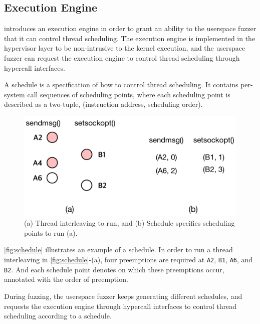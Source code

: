

\subsection{Execution Engine}
\label{ss:engine}

\sys introduces an execution engine in order to grant an ability to
the userspace fuzzer that it can control thread scheduling.
%
The execution engine is implemented in the hypervisor layer to be
non-intrusive to the kernel execution, and the userspace fuzzer can
request the execution engine to control thread scheduling through
hypercall interfaces.


%
A schedule is a specification of how to control thread scheduling.
%
It contains per-system call sequences of scheduling points, where each
scheduling point is described as a two-tuple, (instruction address,
scheduling order).

\begin{figure}[t]
  \centering
  \includegraphics[width=0.9\linewidth]{fig/schedule.pdf}
  \caption{(a) Thread interleaving to run, and (b) Schedule specifies
    scheduling points to run (a).}
  \label{fig:schedule}
\end{figure}

\autoref{fig:schedule} illustrates an example of a schedule. In order
to run a thread interleaving in \autoref{fig:schedule}-(a), four
preemptions are required at \texttt{A2}, \texttt{B1}, \texttt{A6}, and
\texttt{B2}.
%
And each schedule point denotes on which these preemptions occur,
annotated with the order of preemption.


During fuzzing, the userspace fuzzer keeps generating different
schedules, and requests the execution engine through hypercall
interfaces to control thread scheduling according to a schedule.






